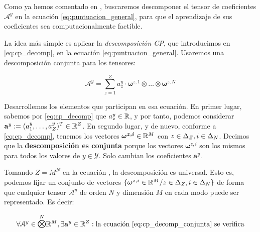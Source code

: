 Como ya hemos comentado en , buscaremos descomponer el tensor de coeficientes $\mathcal{A}^y$ en la ecuación \eqref{eq:puntuacion_general}, para que el aprendizaje de sus coeficientes sea computacionalmente factible.

La idea más simple es aplicar la \textit{descomposición CP}, que introducimos en \eqref{eq:cp_decomp}, en la ecuación \eqref{eq:puntuacion_general}. Usaremos una descomposición conjunta para los tensores:

\begin{equation} \label{eq:cp_decomp_conjunta}
    \mathcal{A}^y = \sum_{z = 1}^Z a_z^y \cdot \boldsymbol{\omega}^{z, 1} \otimes \ldots \otimes \boldsymbol{\omega}^{z, N}
\end{equation}

Desarrollemos los elementos que participan en esa ecuación. En primer lugar, sabemos por \eqref{eq:cp_decomp} que $a_z^y \in \mathbb{R}$, y por tanto, podemos considerar $\mathbf{a}^y := (a_1^y, \ldots, a_Z^y)^T \in \mathbb{R}^Z$. En segundo lugar, y de nuevo, conforme a \eqref{eq:cp_decomp}, tenemos los vectores $\boldsymbol{\omega^{z, i}} \in \mathbb{R}^M$ con $z \in \Delta_{Z}, i \in \Delta_{N}$. Decimos que la \textbf{descomposición es conjunta} porque los vectores $\boldsymbol{\omega}^{z, i}$ son los mismos para todos los valores de $y \in \mathcal{Y}$. Solo cambian los coeficientes $\mathbf{a}^y$.

\begin{proposicion}
    Tomando $Z = M^N$ en la ecuación , la descomposición es universal. Esto es, podemos fijar un conjunto de vectores $\{\boldsymbol{\omega}^{z, i} \in \mathbb{R}^M / z \in \Delta_{Z}, i \in \Delta_{N} \}$ de forma que cualquier tensor $\mathcal{A}^y$ de orden $N$ y dimensión $M$ en cada modo puede ser representado. Es decir:

    \begin{equation}
        \forall \mathcal{A}^y \in \esptensores{N}{M}, \exists \mathbf{a}^y \in \R^Z: \text{la ecuación \refeq{eq:cp_decomp_conjunta} se verifica}
    \end{equation}
\end{proposicion}

